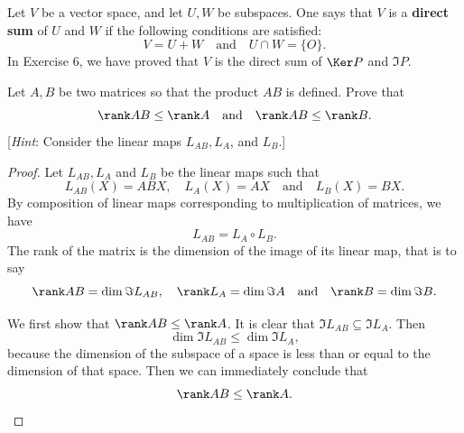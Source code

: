 {{   Let $V$ be a vector space, and let $U, W$ be subspaces. 
   One says that $V$ is a \textbf{direct sum} of $U$ and $W$ if the following conditions are satisfied: 
   \begin{equation*}
        V = U + W \quad \text{and} \quad U \cap W = \{ O \}. 
   \end{equation*}
   In Exercise 6, we have proved that $V$ is the direct sum of $\Ker P$ and $\Im P$. 
   \item 
   \item 
   \item 
   Let $A, B$ be two matrices so that the product $AB$ is defined. 
   Prove that 
   \begin{equation*}
        \rank AB \leq \rank A \quad \text{and} \quad \rank AB \leq \rank B. 
   \end{equation*}
   [\textit{Hint}: Consider the linear maps $L_{AB}, L_A$, and $L_B$.] 
   \begin{solution}
       \begin{proof}
           Let $L_{AB}, L_A$ and $L_B$ be the linear maps such that
           \begin{equation*}
                L_{AB}(X) = ABX, \quad L_A(X) = AX \quad \text{and} \quad L_B(X) = BX. 
           \end{equation*}
           By composition of linear maps corresponding to multiplication of matrices, we have 
           \begin{equation*}
                L_{AB} = L_A \circ L_B. 
           \end{equation*}
           The rank of the matrix is the dimension of the image of its linear map, that is to say 
           \begin{equation*}
                \rank AB = \dim \Im L_{AB}, \quad \rank L_A = \dim \Im A \quad \text{and} \quad \rank B = \dim \Im B. 
           \end{equation*}

           We first show that $\rank AB \leq \rank A$. 
           It is clear that $\Im L_{AB} \subseteq \Im L_{A}$. 
           Then 
           \begin{equation*}
                \dim \Im L_{AB} \leq \dim \Im L_{A}, 
           \end{equation*}
           because the dimension of the subspace of a space is less than or equal to the dimension of that space. 
           Then we can immediately conclude that 
           \begin{equation*}
                \rank AB \leq \rank A. 
           \end{equation*}


\end{proof}
\end{solution}}}
